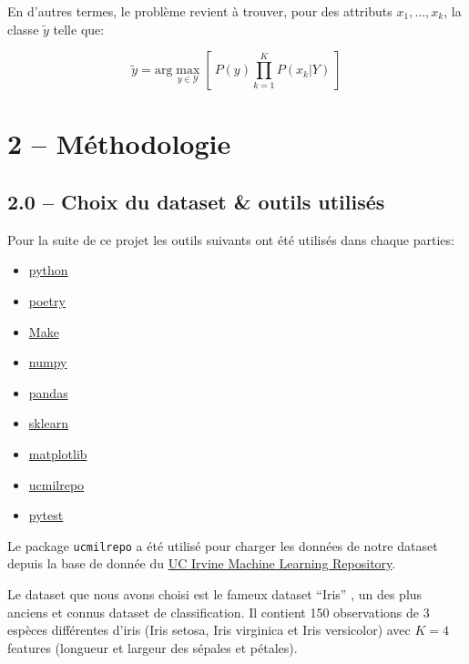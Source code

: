 \documentclass[
]{article}
\providecommand{\tightlist}{%
  \setlength{\itemsep}{0pt}\setlength{\parskip}{0pt}}
\begin{document}
En d'autres termes, le problème revient à trouver, pour des attributs
\(x_1, \ldots, x_k\), la classe \(\tilde{y}\) telle que:

\[
\tilde{y} = \text{arg}\max_{y \in \mathcal{Y}} \left[\  P(y) \prod_{k = 1}^K{P(x_k | Y)}\  \right]
\]

\hypertarget{muxe9thodologie}{%
\section{2 -- Méthodologie}\label{muxe9thodologie}}

\hypertarget{choix-du-dataset-outils-utilisuxe9s}{%
\subsection{2.0 -- Choix du dataset \& outils
utilisés}\label{choix-du-dataset-outils-utilisuxe9s}}

Pour la suite de ce projet les outils suivants ont été utilisés dans
chaque parties:

\begin{itemize}
\tightlist
\item
  \href{https://www.python.org/}{python}
\item
  \href{https://python-poetry.org/}{poetry}
\item
  \href{https://www.gnu.org/software/make/}{Make}
\item
  \href{https://numpy.org/}{numpy}
\item
  \href{https://pandas.pydata.org/}{pandas}
\item
  \href{https://scikit-learn.org/stable/}{sklearn}
\item
  \href{https://matplotlib.org/}{matplotlib}
\item
  \href{https://github.com/uci-ml-repo/ucimlrepo}{ucmilrepo}
\item
  \href{https://docs.pytest.org/en/stable/}{pytest}
\end{itemize}

Le package \texttt{ucmilrepo} a été utilisé pour charger les données de
notre dataset depuis la base de donnée du
\href{https://archive.ics.uci.edu/ml/index}{UC Irvine Machine Learning
Repository}.

Le dataset que nous avons choisi est le fameux dataset ``Iris''
\cite{r.a.fisherIris1936}, un des plus anciens et connus dataset de
classification. Il contient 150 observations de 3 espèces différentes
d'iris (Iris setosa, Iris virginica et Iris versicolor) avec \(K = 4\)
features (longueur et largeur des sépales et pétales).
\end{document}
